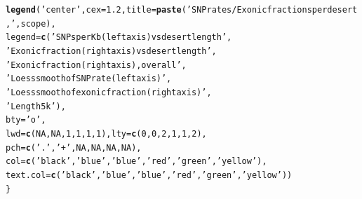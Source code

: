 \documentclass{article}\usepackage[]{graphicx}\usepackage[]{color}
\makeatletter
\newcommand{\hlnum}[1]{\textcolor[rgb]{0.686,0.059,0.569}{#1}}%
\newcommand{\hlstr}[1]{\textcolor[rgb]{0.192,0.494,0.8}{#1}}%
\newcommand{\hlstd}[1]{\textcolor[rgb]{0.345,0.345,0.345}{#1}}%
\newcommand{\hlkwc}[1]{\textcolor[rgb]{0.333,0.667,0.333}{#1}}%
\newcommand{\hlkwd}[1]{\textcolor[rgb]{0.737,0.353,0.396}{\textbf{#1}}}%
\newenvironment{kframe}{%
 \def\at@end@of@kframe{}%
 \ifinner\ifhmode%
  \def\at@end@of@kframe{\end{minipage}}%
  \begin{minipage}{\columnwidth}%
 \fi\fi%
 \def\FrameCommand##1{\hskip\@totalleftmargin \hskip-\fboxsep
 \colorbox{shadecolor}{##1}\hskip-\fboxsep
     \hskip-\linewidth \hskip-\@totalleftmargin \hskip\columnwidth}%
 \MakeFramed {\advance\hsize-\width
   \@totalleftmargin\z@ \linewidth\hsize
   \@setminipage}}%
 {\par\unskip\endMakeFramed%
 \at@end@of@kframe}
\newenvironment{knitrout}{}{} %
\makeatother
\begin{document}
\begin{knitrout}
\begin{kframe}
\begin{alltt}
  \hlkwd{legend}\hlstd{(}\hlstr{'center'}\hlstd{,}\hlkwc{cex}\hlstd{=}\hlnum{1.2}\hlstd{,}\hlkwc{title}\hlstd{=}\hlkwd{paste}\hlstd{(}\hlstr{'SNP rates/Exonic fractions per desert,'}\hlstd{, scope),}
         \hlkwc{legend}\hlstd{=}\hlkwd{c}\hlstd{(}\hlstr{'SNPs per Kb  (left axis) vs desert length'}\hlstd{,}
                  \hlstr{'Exonic fraction (right axis) vs desert length '}\hlstd{,}
                  \hlstr{'Exonic fraction (right axis), overall'}\hlstd{,}
                  \hlstr{'Loess smooth of SNP rate (left axis)'}\hlstd{,}
                  \hlstr{'Loess smooth of exonic fraction (right axis) '}\hlstd{,}
                  \hlstr{'Length 5k'}\hlstd{),}
         \hlkwc{bty}\hlstd{=}\hlstr{'o'}\hlstd{,}
         \hlkwc{lwd}\hlstd{=}\hlkwd{c}\hlstd{(}\hlnum{NA}\hlstd{,}\hlnum{NA}\hlstd{,}\hlnum{1}\hlstd{,}\hlnum{1}\hlstd{,}\hlnum{1}\hlstd{,}\hlnum{1}\hlstd{),}\hlkwc{lty}\hlstd{=}\hlkwd{c}\hlstd{(}\hlnum{0}\hlstd{,}\hlnum{0}\hlstd{,}\hlnum{2}\hlstd{,}\hlnum{1}\hlstd{,}\hlnum{1}\hlstd{,}\hlnum{2}\hlstd{),}
         \hlkwc{pch}\hlstd{=}      \hlkwd{c}\hlstd{(}   \hlstr{'.'}\hlstd{,}    \hlstr{'+'}\hlstd{,}     \hlnum{NA}\hlstd{,}    \hlnum{NA}\hlstd{,}      \hlnum{NA}\hlstd{,}       \hlnum{NA}\hlstd{),}
         \hlkwc{col}\hlstd{=}     \hlkwd{c}\hlstd{(}\hlstr{'black'}\hlstd{,} \hlstr{'blue'}\hlstd{,} \hlstr{'blue'}\hlstd{,} \hlstr{'red'}\hlstd{,} \hlstr{'green'}\hlstd{,} \hlstr{'yellow'}\hlstd{),}
         \hlkwc{text.col}\hlstd{=}\hlkwd{c}\hlstd{(}\hlstr{'black'}\hlstd{,} \hlstr{'blue'}\hlstd{,} \hlstr{'blue'}\hlstd{,} \hlstr{'red'}\hlstd{,} \hlstr{'green'}\hlstd{,} \hlstr{'yellow'}\hlstd{))}
\hlstd{\}}
\end{alltt}
\end{kframe}
\end{knitrout}
\end{document}
